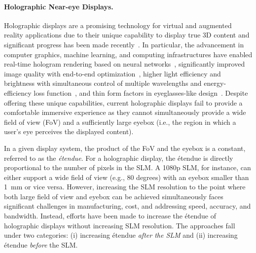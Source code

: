 
\paragraph{\bf{Holographic Near-eye Displays.}} Holographic displays are a promising technology for virtual and augmented reality applications due to their unique capability to display true 3D content and significant progress has been made recently~\cite{Javidi2021-vh, Chang2020-ja, Pi2022-mr}. In particular, the advancement in computer graphics, machine learning, and computing infrastructures have enabled real-time hologram rendering based on neural networks~\cite{shi2021neural, peng2020neural}, significantly improved image quality with end-to-end optimization~\cite{peng2020neural,chakravarthula2020learned,choi2022flex}, higher light efficiency and brightness with simultaneous control of multiple wavelengths and energy-efficiency loss function~\cite{Markley2023-eg, Chao2023-wl, Kavakli2023-nd}, and thin form factors in eyeglasses-like design~\cite{maimone2017holo,jang2024waveguide, Kim2022-cd,gopakumar2024ar}. Despite offering these unique capabilities, current holographic displays fail to provide a comfortable immersive experience as they cannot simultaneously provide a wide field of view (FoV) and a sufficiently large eyebox (i.e., the region in which a user's eye perceives the displayed content). 

In a given display system, the product of the FoV and the eyebox is a constant, referred to as the {\it \'etendue}. For a holographic display, the \'etendue is directly proportional to the number of pixels in the SLM. A 1080p SLM, for instance, can either support a wide field of view (e.g., 80 degrees) with an eyebox smaller than 1~mm or vice versa. %
However, increasing the SLM resolution to the point where both large field of view and eyebox can be achieved simultaneously faces significant challenges in manufacturing, cost, and addressing speed, accuracy, and bandwidth. Instead, efforts have been made to increase the \'etendue of holographic displays without increasing SLM resolution.
The approaches fall under two categories: (i) increasing \'etendue {\it after the SLM} and (ii) increasing \'etendue {\it before} the SLM.


